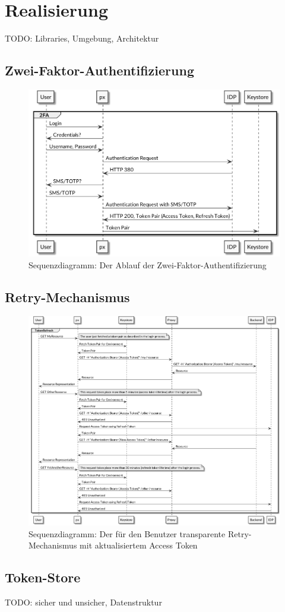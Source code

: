 \section{Realisierung}
\label{sec:Realisierung}

TODO: Libraries, Umgebung, Architektur

\subsection{Zwei-Faktor-Authentifizierung}

\begin{figure}
    \centering
    \includegraphics[width=\linewidth]{pics/sequence-2fa.png}
    \caption{Sequenzdiagramm: Der Ablauf der Zwei-Faktor-Authentifizierung}
\end{figure}

\subsection{Retry-Mechanismus}

\begin{figure}
    \centering
    \includegraphics[width=\linewidth]{pics/sequence-retry.png}
    \caption{Sequenzdiagramm: Der für den Benutzer transparente Retry-Mechanismus mit aktualisiertem Access Token}
\end{figure}

\subsection{Token-Store}

TODO: sicher und unsicher, Datenstruktur
